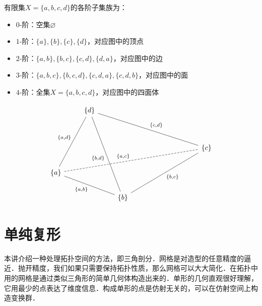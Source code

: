 \begin{example}

有限集$X=\{a,b,c,d\}$的各阶子集族为：
\begin{itemize}
\item $0$-阶：空集$\varnothing$
\item $1$-阶：$\{a\},\{b\},\{c\},\{d\}$，对应图中的顶点
\item $2$-阶：$\{a,b\},\{b,c\},\{c,d\},\{d,a\}$，对应图中的边
\item $3$-阶：$\{a,b,c\},\{b,c,d\},\{c,d,a\},\{c,d,b\}$，对应图中的面
\item $4$-阶：全集$X=\{a,b,c,d\}$，对应图中的四面体
\end{itemize}

$$
\begin{tikzcd}
                                                                                       & \{d\} \arrow[lddd, "{\{a,d\}}"', no head] \arrow[rdddd, "{\{b,d\}}"', no head] &                                             &  &  &  &                                              \\
                                                                                       &                                                                                &                                             &  &  &  &                                              \\
                                                                                       &                                                                                &                                             &  &  &  & \{c\} \arrow[llllluu, "{\{c,d\}}"', no head] \\
\{a\} \arrow[rrd, "{\{a,b\}}"', no head] \arrow[rrrrrru, "{\{a,c\}}", no head, dashed] &                                                                                &                                             &  &  &  &                                              \\
                                                                                       &                                                                                & \{b\} \arrow[rrrruu, "{\{b,c\}}"', no head] &  &  &  &                                             
\end{tikzcd}
$$

\end{example}


    \section{单纯复形}
            本讲介绍一种处理拓扑空间的方法，即三角剖分．网格是对造型的任意精度的逼近．抛开精度，我们如果只需要保持拓扑性质，那么网格可以大大简化．在拓扑中用的网格是通过类似三角形的简单几何体构造出来的．单形的几何直观很好理解，它用最少的点表达了维度信息．构成单形的点是仿射无关的，可以在仿射空间上构造变换群．\par

